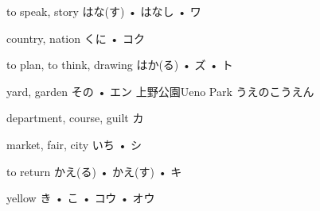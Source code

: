 



\setcounter{cardnum}{65}

		{to speak, story}
		{はな(す) • はなし • ワ}
		{}{}
		{}{}
		{}{}
		{}{}
		{}{}

		{country, nation}
		{くに • コク}
		{}{}
		{}{}
		{}{}
		{}{}
		{}{}

		{to plan, to think, drawing}
		{はか(る) • ズ • ト}
		{}{}
		{}{}
		{}{}
		{}{}
		{}{}

		{yard, garden}
		{その • エン}
		{上野公園}{Ueno Park うえのこうえん}
		{}{}
		{}{}
		{}{}
		{}{}

		{department, course, guilt}
		{カ}
		{}{}
		{}{}
		{}{}
		{}{}
		{}{}

		{market, fair, city}
		{いち • シ}
		{}{}
		{}{}
		{}{}
		{}{}
		{}{}

		{to return}
		{かえ(る) • かえ(す) • キ}
		{}{}
		{}{}
		{}{}
		{}{}
		{}{}

		{yellow}
		{き • こ • コウ • オウ}
		{}{}
		{}{}
		{}{}
		{}{}
		{}{}

